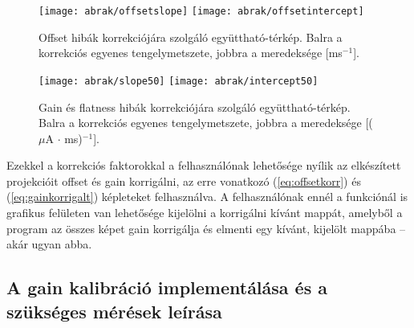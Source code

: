 \documentclass[a4paper,12pt]{article}
\begin{document}
 
 \begin{figure}[htbp]
\center
\texttt{[image: abrak/offsetslope]}
\texttt{[image: abrak/offsetintercept]}
\caption{Offset hibák korrekciójára szolgáló együttható-térkép. Balra a korrekciós egyenes tengelymetszete, jobbra a meredeksége [ms$^{-1}$].}
\label{fig:offsetfaktorok}
\end{figure}

 
 
  \begin{figure}[htbp]
\center
\texttt{[image: abrak/slope50]}
\texttt{[image: abrak/intercept50]}
\caption{Gain és flatness hibák korrekciójára szolgáló együttható-térkép. Balra a korrekciós egyenes tengelymetszete, jobbra a meredeksége [($\mu$A $\cdot$ ms)$^{-1}$].}
\label{fig:offsetfaktorok2}
\end{figure}

 
 

 Ezekkel a korrekciós faktorokkal a felhasználónak lehetősége nyílik az elkészített projekcióit offset és gain korrigálni, az erre vonatkozó (\ref{eq:offsetkorr}) és (\ref{eq:gainkorrigalt}) képleteket felhasználva.  A felhasználónak ennél a funkciónál is grafikus felületen van lehetősége kijelölni a korrigálni kívánt mappát, amelyből a program az összes képet gain korrigálja és elmenti egy kívánt, kijelölt mappába -- akár ugyan abba. 
 
 
\subsection{A gain kalibráció implementálása és a szükséges mérések leírása} 
\label{sec:reduce}
 
\end{document}

